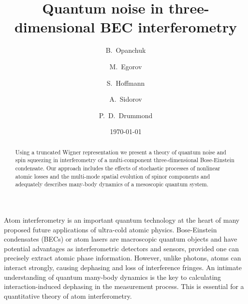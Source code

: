 \documentclass[aps,prl,twocolumn,showpacs,amsmath,amssymb,superscriptaddress,flushbottom,noraggedfooter]{revtex4-1}
\begin{document}
\title{Quantum noise in three-dimensional BEC interferometry}

\newcommand{\swinburneaffiliation}{Centre for Atom Optics and Ultrafast Spectroscopy, Swinburne University of Technology, Hawthorn, VIC 3122, Australia}
\newcommand{\uqaffiliation}{Physics Department, University of Queensland, Queensland, Australia}

\author{B.~Opanchuk}
\author{M.~Egorov}
\author{S.~Hoffmann}
\author{A.~Sidorov}
\author{P.~D.~Drummond}

\begin{abstract}
Using a truncated Wigner representation we present a theory of quantum noise and spin squeezing in interferometry of a multi-component three-dimensional Bose-Einstein condensate.
Our approach includes the effects of stochastic processes of nonlinear atomic losses and the multi-mode spatial evolution of spinor components and adequately describes many-body dynamics of a mesoscopic quantum system.
\end{abstract}


\date{\today}

\maketitle

Atom interferometry is an important quantum technology
at the heart of many proposed future applications of ultra-cold atomic physics.
Bose-Einstein condensates (BECs) or atom lasers are macroscopic quantum objects and have potential advantages as interferometric detectors and sensors,
provided one can precisely extract atomic phase information.
However, unlike photons, atoms can interact strongly, causing dephasing and loss of interference fringes.
An intimate understanding of quantum many-body dynamics is the key to calculating
interaction-induced dephasing in the measurement process.
This is essential for a quantitative theory of atom interferometry.
\end{document}

